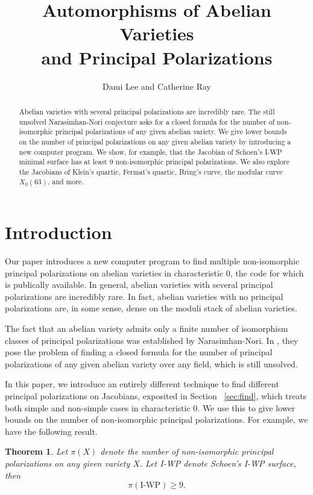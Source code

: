\documentclass[12pt,reqno]{amsart}
\title[Automorphisms of Abelian Varieties and Principal Polarizations]{Automorphisms of Abelian Varieties \\ and Principal Polarizations}
\author{Dami Lee and Catherine Ray}
\newtheorem{theorem}{Theorem}
\theoremstyle{definition}
\theoremstyle{remark}
\begin{document}
  
\maketitle

\begin{abstract} Abelian varieties with several principal polarizations are incredibly rare. The still unsolved Narasimhan-Nori conjecture asks for a closed formula for the number of non-isomorphic principal polarizations of any given abelian variety. We give lower bounds on the number of principal polarizations on any given abelian variety by introducing a new computer program.
We show, for example, that the Jacobian of Schoen's I-WP minimal surface has at least 9 non-isomorphic principal polarizations. We also explore the Jacobians of Klein's quartic, Fermat's quartic, Bring's curve, the modular curve $X_0(63)$, and more.   
\end{abstract}

\section{Introduction}

Our paper introduces a new computer program to find multiple non-isomorphic principal polarizations on abelian varieties in characteristic 0, the code for which is publically available. In general, abelian varieties with several principal polarizations are incredibly rare. In fact, abelian varieties with no principal polarizations are, in some sense, dense on the moduli stack of abelian varieties. %

The fact that an abelian variety admits only a finite number of isomorphism classes of principal polarizations was established by Narasimhan-Nori. In \cite{nn}, they pose the problem of finding a closed formula for the number of principal polarizations of any given abelian variety over any field, which is still unsolved. 

In this paper, we introduce an entirely different technique to find different principal polarizations on Jacobians, exposited in Section ~\ref{sec:find}, which treats both simple and non-simple cases in characteristic 0. We use this to give lower bounds on the number of non-isomorphic principal polarizations. For example, we have the following result. 

\begin{theorem} \label{IWP} Let $\pi(X)$ denote the number of non-isomorphic principal polarizations on any given variety $X$. Let I-WP denote Schoen's I-WP surface, then $$\pi(\text{I-WP}) \geq 9.$$\end{theorem}
\end{document}
